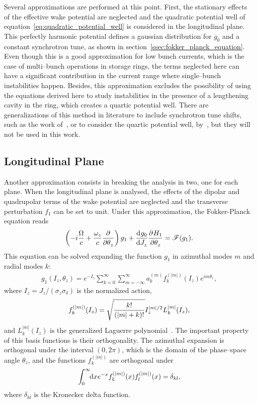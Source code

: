     Several approximations are performed at this point. First, the stationary effects of the effective wake potential are neglected and the quadratic potential well of equation~\eqref{eq:quadratic_potential_well} is considered in the longitudinal plane. This perfectly harmonic potential defines a gaussian distribution for $g_0$ and a constant synchrotron tune, as shown in section~\ref{ssec:fokker_planck_equation}. Even though this is a good approximation for low bunch currents, which is the case of multi--bunch operations in storage rings, the terms neglected here can have a significant contribution in the current range where single--bunch instabilities happen. Besides, this approximation excludes the possibility of using the equations derived here to study instabilities in the presence of a lengthening cavity in the ring, which creates a quartic potential well. There are generalizations of this method in literature to include synchrotron tune shifts, such as the work of~, or to consider the quartic potential well, by~, but they will not be used in this work.

\subsection{Longitudinal Plane}\label{ssec:longitudinal_plane}

    Another approximation consists in breaking the analysis in two, one for each plane. When the longitudinal plane is analysed, the effects of the dipolar and quadrupolar terms of the wake potential are neglected and the transverse perturbation $f_1$ can be set to unit. Under this approximation, the Fokker-Planck equation reads
    \begin{align}
        \fof{-i\frac{\Omega}{c} +\frac{\omega_z}{c}\derpar{}{\theta_z}}g_1 + \dertot{g_0}{J_z}\derpar{H_1}{\theta_z} = \mathscr{F}(g_1).
    \end{align}
    This equation can be solved expanding the function $g_1$ in azimuthal modes $m$ and radial modes $k$:
    \begin{align}
        g_1(I_z, \theta_z) = e^{-I_z}\sum_{k=0}^\infty\sum_{m=-\infty}^\infty
        a_k^{(m)} f_k^{(|m|)}(I_z)e^{im\theta_z},
    \end{align}
    where $I_z = J_z/(\sigma_z\sigma_\delta)$ is the normalized action,
    \begin{align}
        f_k^{(|m|)}(I_z) = \sqrt{\frac{k!}{\fof{|m|+k}!}}I_z^{|m|/2}L_k^{|m|}(I_z),
    \end{align}
    and $L_k^{|m|}(I_z)$ is the generalized Laguerre polynomial~\cite{wiki2018}. The important property of this basis functions is their orthogonality. The azimuthal expansion is orthogonal under the interval $(0, 2\pi)$, which is the domain of the phase--space angle $\theta_z$, and the functions $f_k^{(|m|)}$ are orthogonal under
    \begin{align}
        \defint{x}{e^{-x}f_k^{(|m|)}(x)f_l^{(|m|)}(x)}{0}{\infty} = \delta_{kl},
    \end{align}
    where $\delta_{kl}$ is the Kronecker delta function.

